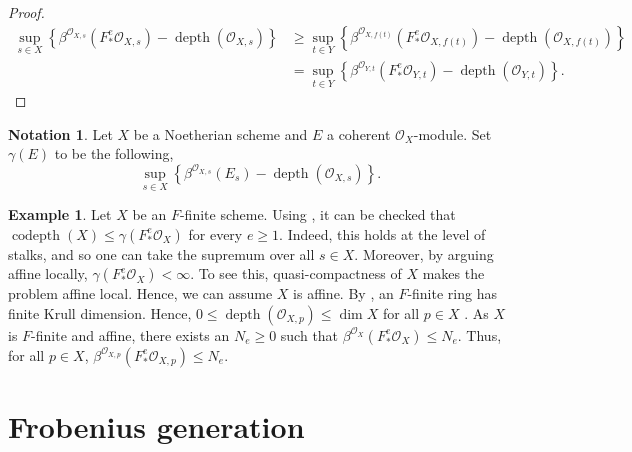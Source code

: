 \documentclass[11pt]{amsart}
\theoremstyle{plain}
\theoremstyle{definition}
\newtheorem{example}[theorem]{Example}
\newtheorem{notation}[theorem]{Notation}
\numberwithin{equation}{section}
\numberwithin{theorem}{section}
\begin{document}
\begin{proof}
    \begin{displaymath}
        \begin{aligned}
        \sup_{s\in X} \left\{ \beta^{\mathcal{O}_{X,s}} (F_\ast^e \mathcal{O}_{X,s}) - \operatorname{depth}(\mathcal{O}_{X,s})  \right\} 
        &\geq \sup_{t\in Y} \left\{ \beta^{\mathcal{O}_{X,f(t)}} (F_\ast^e \mathcal{O}_{X,f(t)}) - \operatorname{depth}(\mathcal{O}_{X,f(t)})  \right\}
        \\&= \sup_{t\in Y} \left\{ \beta^{\mathcal{O}_{Y,t}} (F_\ast^e \mathcal{O}_{Y,t}) - \operatorname{depth}(\mathcal{O}_{Y,t}) \right\}.
        \end{aligned}
    \end{displaymath}
\end{proof}

\begin{notation}
    \label{not:gamme_function}
    Let $X$ be a Noetherian scheme and $E$ a coherent $\mathcal{O}_X$-module. Set $\gamma (E)$ to be the following,
    \begin{displaymath}
        \sup_{s\in X} \left\{ \beta^{\mathcal{O}_{X,s}} (E_s) - \operatorname{depth}(\mathcal{O}_{X,s})  \right\}.
    \end{displaymath}
\end{notation}

\begin{example}
    \label{ex:beta_depth_to_codepth}
    Let $X$ be an $F$-finite scheme. 
    Using , it can be checked that $\operatorname{codepth}(X)\leq \gamma (F^e_\ast \mathcal{O}_X)$ for every $e\geq 1$. 
    Indeed, this holds at the level of stalks, and so one can take the supremum over all $s\in X$. 
    Moreover, by arguing affine locally, $\gamma (F^e_\ast \mathcal{O}_X)<\infty$. 
    To see this, quasi-compactness of $X$ makes the problem affine local. Hence, we can assume $X$ is affine. 
    By \cite[Proposition 1.1]{Kunz:1976}, an $F$-finite ring has finite Krull dimension. 
    Hence, $0\leq \operatorname{depth}(\mathcal{O}_{X,p})\leq \dim X$ for all $p\in X$ \cite[\href{https://stacks.math.columbia.edu/tag/00LK}{Tag 00LK}]{stacks-project}. 
    As $X$ is $F$-finite and affine, there exists an $N_e\geq 0$ such that $\beta^{\mathcal{O}_X} (F^e_\ast \mathcal{O}_X)\leq N_e$. 
    Thus, for all $p\in X$, $\beta^{\mathcal{O}_{X,p}} (F^e_\ast \mathcal{O}_{X,p})\leq N_e$.
\end{example}

\section{Frobenius generation}
\label{sec:frob_gen}
\end{document}
